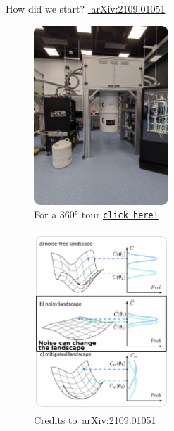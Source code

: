 \documentclass[8pt, xcolor={svgnames}, hyperref={linkcolor=black}]{beamer}
\begin{document}
\begin{frame}{How did we start? \hfill \href{https://arxiv.org/abs/2109.01051}{\faBook\,\,arXiv:2109.01051}}
\begin{multicols}{2}
\begin{figure}
\includegraphics[width=0.45\textwidth, height=0.8\textheight]{figures/tii_lab.png}
\caption*{For a 360° tour \href{https://files-prod.tii.ae/360/TII-QRC-Computing-Lab.html}{\texttt{click here!}}}
\end{figure}
\begin{figure}
\includegraphics[width=0.45\textwidth, height=0.8\textheight]{figures/NIBP_2.png}
\caption*{Credits to \href{https://arxiv.org/abs/2109.01051}{\faBook\,arXiv:2109.01051}}
\end{figure}
\end{multicols}
\end{frame}
\end{document}
